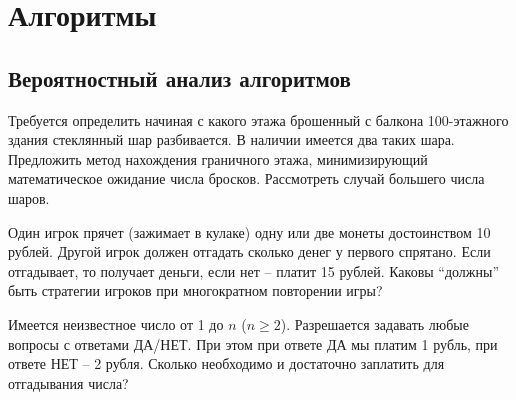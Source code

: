 \section{Алгоритмы}

\subsection{Вероятностный анализ алгоритмов}

\begin{problem}

Требуется определить начиная с какого этажа брошенный с балкона 100-этажного здания стеклянный шар разбивается. В наличии имеется два таких шара. Предложить метод нахождения граничного этажа, минимизирующий математическое ожидание числа бросков. Рассмотреть случай большего числа шаров.  

\end{problem}

\begin{problem}
Один игрок прячет (зажимает в кулаке) одну или две монеты достоинством 10 рублей. Другой игрок должен отгадать сколько денег у первого спрятано. Если отгадывает, то получает деньги, если нет -- платит 15 рублей. Каковы ``должны'' быть стратегии игроков при многократном повторении игры?

\end{problem}

\begin{problem}
Имеется неизвестное число от 1 до $n$ ($n\ge 2$). Разрешается задавать любые вопросы с ответами ДА/НЕТ. При этом при ответе ДА мы платим 1 рубль, при ответе НЕТ -- 2 рубля. Сколько необходимо и достаточно заплатить для отгадывания числа?
\end{problem}

